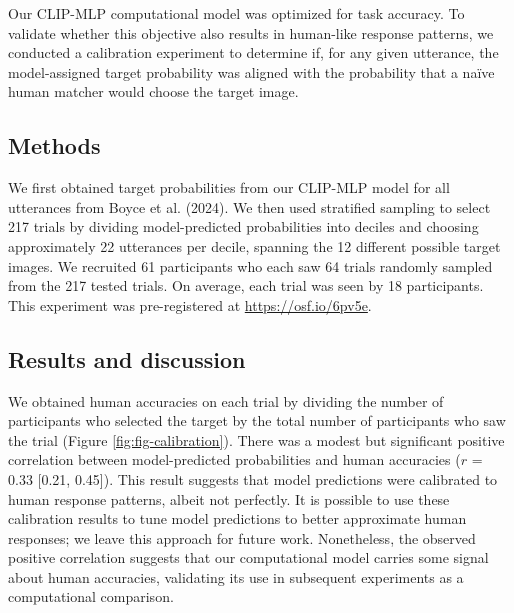\documentclass[10pt, letterpaper]{article}
\begin{document}
Our CLIP-MLP computational model was optimized for task accuracy. To
validate whether this objective also results in human-like response
patterns, we conducted a calibration experiment to determine if, for any
given utterance, the model-assigned target probability was aligned with
the probability that a naïve human matcher would choose the target
image.

\subsection{Methods}\label{methods}

We first obtained target probabilities from our CLIP-MLP model for all
utterances from Boyce et al. (2024). We then used stratified sampling to
select 217 trials by dividing model-predicted probabilities into deciles
and choosing approximately 22 utterances per decile, spanning the 12
different possible target images. We recruited 61 participants who each
saw 64 trials randomly sampled from the 217 tested trials. On average,
each trial was seen by 18 participants. This experiment was
pre-registered at \url{https://osf.io/6pv5e}.

\subsection{Results and discussion}\label{results-and-discussion}

We obtained human accuracies on each trial by dividing the number of
participants who selected the target by the total number of participants
who saw the trial (Figure \ref{fig:fig-calibration}). There was a modest
but significant positive correlation between model-predicted
probabilities and human accuracies (\(r\) = 0.33 {[}0.21, 0.45{]}). This
result suggests that model predictions were calibrated to human response
patterns, albeit not perfectly. It is possible to use these calibration
results to tune model predictions to better approximate human responses;
we leave this approach for future work. Nonetheless, the observed
positive correlation suggests that our computational model carries some
signal about human accuracies, validating its use in subsequent
experiments as a computational comparison.
\end{document}
